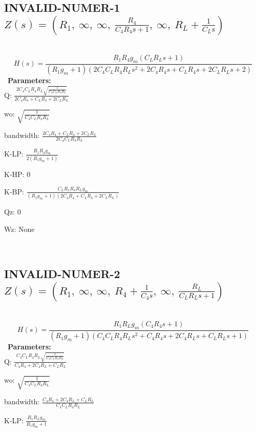 \documentclass{article}
\begin{document}
\subsection{INVALID-NUMER-1 $Z(s) = \left( R_{1}, \  \infty, \  \infty, \  \frac{R_{4}}{C_{4} R_{4} s + 1}, \  \infty, \  R_{L} + \frac{1}{C_{L} s}\right)$ } \ 
\textbf{\[H(s) = \frac{R_{1} R_{4} g_{m} \left(C_{L} R_{L} s + 1\right)}{\left(R_{1} g_{m} + 1\right) \left(2 C_{4} C_{L} R_{4} R_{L} s^{2} + 2 C_{4} R_{4} s + C_{L} R_{4} s + 2 C_{L} R_{L} s + 2\right)}\] } \ 
\textbf{Parameters:}\\ 

Q: $\frac{2 C_{4} C_{L} R_{4} R_{L} \sqrt{\frac{1}{C_{4} C_{L} R_{4} R_{L}}}}{2 C_{4} R_{4} + C_{L} R_{4} + 2 C_{L} R_{L}}$\ 

wo: $\sqrt{\frac{1}{C_{4} C_{L} R_{4} R_{L}}}$\ 

bandwidth: $\frac{2 C_{4} R_{4} + C_{L} R_{4} + 2 C_{L} R_{L}}{2 C_{4} C_{L} R_{4} R_{L}}$\ 

K-LP: $\frac{R_{1} R_{4} g_{m}}{2 \left(R_{1} g_{m} + 1\right)}$\ 

K-HP: $0$\ 

K-BP: $\frac{C_{L} R_{1} R_{4} R_{L} g_{m}}{\left(R_{1} g_{m} + 1\right) \left(2 C_{4} R_{4} + C_{L} R_{4} + 2 C_{L} R_{L}\right)}$\ 

Qz: $0$\ 

Wz: $\text{None}$\ 

\ 

\subsection{INVALID-NUMER-2 $Z(s) = \left( R_{1}, \  \infty, \  \infty, \  R_{4} + \frac{1}{C_{4} s}, \  \infty, \  \frac{R_{L}}{C_{L} R_{L} s + 1}\right)$ } \ 
\textbf{\[H(s) = \frac{R_{1} R_{L} g_{m} \left(C_{4} R_{4} s + 1\right)}{\left(R_{1} g_{m} + 1\right) \left(C_{4} C_{L} R_{4} R_{L} s^{2} + C_{4} R_{4} s + 2 C_{4} R_{L} s + C_{L} R_{L} s + 1\right)}\] } \ 
\textbf{Parameters:}\\ 

Q: $\frac{C_{4} C_{L} R_{4} R_{L} \sqrt{\frac{1}{C_{4} C_{L} R_{4} R_{L}}}}{C_{4} R_{4} + 2 C_{4} R_{L} + C_{L} R_{L}}$\ 

wo: $\sqrt{\frac{1}{C_{4} C_{L} R_{4} R_{L}}}$\ 

bandwidth: $\frac{C_{4} R_{4} + 2 C_{4} R_{L} + C_{L} R_{L}}{C_{4} C_{L} R_{4} R_{L}}$\ 

K-LP: $\frac{R_{1} R_{L} g_{m}}{R_{1} g_{m} + 1}$\ 
\end{document}
